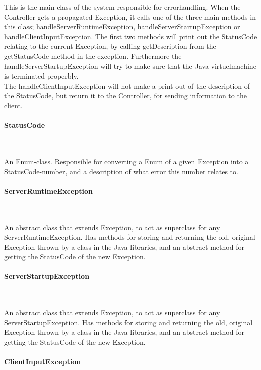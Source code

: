 \documentclass[a4paper,10pt,titlepage]{article}
\begin{document}
This is the main class of the system responsible for errorhandling. When the Controller gets a propagated Exception, it calls one of the three main methods in this class; handleServerRuntimeException, handleServerStartupException or handleClientInputException. The first two methods will print out the StatusCode relating to the current Exception, by calling getDescription from the getStatusCode method in the exception. Furthermore the handleServerStartupException will try to make sure that the Java virtuelmachine is terminated properbly.\\
The handleClientInputException will not make a print out of the description of the StatusCode, but return it to the Controller, for sending information to the client.

				\paragraph{StatusCode}\mbox{}\

An Enum-class. Responsible for converting a Enum of a given Exception into a StatusCode-number, and a description of what error this number relates to.
				
				\paragraph{ServerRuntimeException}\mbox{}\

An abstract class that extends Exception, to act as superclass for any ServerRuntimeException. Has methods for storing and returning the old, original Exception thrown by a class in the Java-libraries, and an abstract method for getting the StatusCode of the new Exception.
				
				\paragraph{ServerStartupException}\mbox{}\

An abstract class that extends Exception, to act as superclass for any ServerStartupException. Has methods for storing and returning the old, original Exception thrown by a class in the Java-libraries, and an abstract method for getting the StatusCode of the new Exception.

				\paragraph{ClientInputException}\mbox{}\
\end{document}
